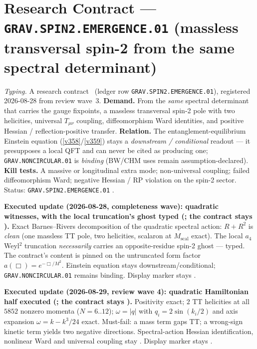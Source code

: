 \section*{Research Contract --- \texttt{GRAV.SPIN2.EMERGENCE.01} (massless transversal spin-2 from the same spectral determinant)}
\noindent\emph{Typing.} A research contract \mO\ (ledger row \texttt{GRAV.SPIN2.EMERGENCE.01}),
registered 2026-08-28 from review wave~3.  \textbf{Demand.}  From the
\emph{same} spectral determinant that carries the gauge fixpoints, a massless transversal
spin-2 pole with two helicities, universal $T_{\mu\nu}$ coupling, diffeomorphism Ward identities,
and positive Hessian / reflection-positive transfer.  \textbf{Relation.}  The
entanglement-equilibrium Einstein equation (\vref{v358}/\vref{v359}) stays a
\emph{downstream / conditional} readout --- it presupposes a local QFT and can never be cited as
producing one; \texttt{GRAV.NONCIRCULAR.01} is \emph{binding} (BW/CHM uses remain
assumption-declared).  \textbf{Kill tests.}  A massive or longitudinal extra mode; non-universal
coupling; failed diffeomorphism Ward; negative Hessian / RP violation on the spin-2 sector.
Status: \texttt{GRAV.SPIN2.EMERGENCE.01} \mO.

\par\smallskip\noindent\textbf{Executed update (2026-08-28, completeness wave): quadratic
witnesses, with the local truncation's ghost typed
(; the contract stays \mO).}
Exact Barnes--Rivers decomposition of the quadratic spectral action: $R{+}R^2$ is \emph{clean}
(one massless TT pole, two helicities, scalaron at $M_{\mathrm{scal}}$ exact).  The local $a_4$
Weyl$^2$ truncation \emph{necessarily} carries an opposite-residue spin-2 ghost --- typed.
The contract's content is pinned on the untruncated form factor $a(\Box)=e^{-\Box/M^2}$.
Einstein equation stays downstream/conditional; \texttt{GRAV.NONCIRCULAR.01} remains binding.
Display marker stays \mO.

\par\smallskip\noindent\textbf{Executed update (2026-08-29, review wave 4): quadratic Hamiltonian
half executed
(; the contract stays \mO).}
Positivity exact; $2$ TT helicities at all $5852$ nonzero momenta ($N=6..12$);
$\omega=|q|$ with $q_i=2\sin(k_i/2)$ and axis expansion $\omega=k-k^3/24$ exact.
Must-fail: a mass term gaps TT; a wrong-sign kinetic term yields two negative directions.
Spectral-action Hessian identification, nonlinear Ward and universal coupling stay \mO.
Display marker stays \mO.

